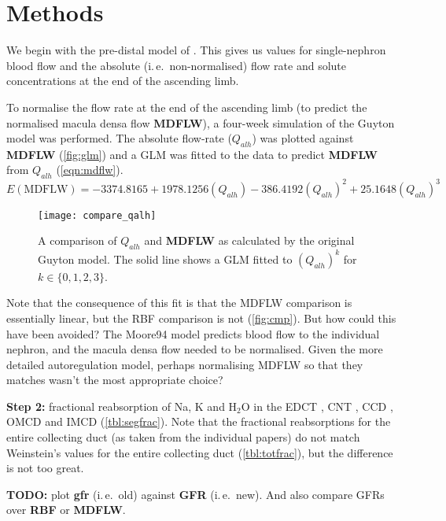 \documentclass{scrartcl}
\newcommand\ie{i.\,e.\ }
\begin{document}
\section{Methods}

We begin with the pre-distal model of \citeauthor{Moore94} \cite{Moore94}. This gives us values for single-nephron blood flow and the absolute (\ie non-normalised) flow rate and solute concentrations at the end of the ascending limb.

To normalise the flow rate at the end of the ascending limb (to predict the normalised macula densa flow \textbf{MDFLW}), a four-week simulation of the Guyton model was performed. The absolute flow-rate ($Q_{alh}$) was plotted against \textbf{MDFLW} (\autoref{fig:glm}) and a GLM was fitted to the data to predict \textbf{MDFLW} from $Q_{alh}$ (\autoref{eqn:mdflw}).
\begin{equation}
  E(\textrm{MDFLW}) = - 3374.8165 + 1978.1256(Q_{alh}) - 386.4192(Q_{alh})^2
  + 25.1648(Q_{alh})^3
  \label{eqn:mdflw}
\end{equation}

\begin{figure}
  \centering
  \texttt{[image: compare\_qalh]}
  \caption{A comparison of $Q_{alh}$ and \textbf{MDFLW} as calculated by the
    original Guyton model. The solid line shows a GLM fitted to
    $(Q_{alh})^k$ for $k \in \{0,1,2,3\}$.}
  \label{fig:glm}
\end{figure}

Note that the consequence of this fit is that the MDFLW comparison is essentially linear, but the RBF comparison is not (\autoref{fig:cmp}). But how could this have been avoided? The Moore94 model predicts blood flow to the individual nephron, and the macula densa flow needed to be normalised. Given the more detailed autoregulation model, perhaps normalising MDFLW so that they matches wasn't the most appropriate choice?

\textbf{Step 2:} fractional reabsorption of Na, K and H$_2$O in the EDCT \cite{Weinst05}, CNT \cite{Weinst05a}, CCD \cite{Weinst01}, OMCD \cite{Weinst00} and IMCD \cite{Weinst98a} (\autoref{tbl:segfrac}). Note that the fractional reabsorptions for the entire collecting duct (as taken from the individual papers) do not match Weinstein's values for the entire collecting duct \cite{Weinst02b} (\autoref{tbl:totfrac}), but the difference is not too great.

\textbf{TODO:} plot \textbf{gfr} (\ie old) against \textbf{GFR} (\ie new). And
also compare GFRs over \textbf{RBF} or \textbf{MDFLW}.
\end{document}
